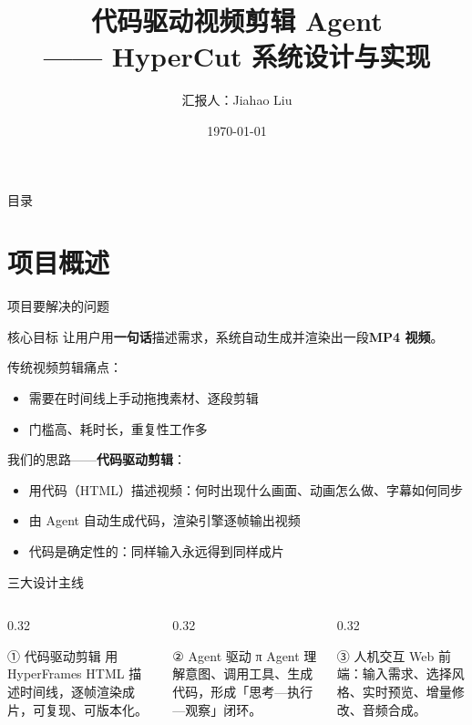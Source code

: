 \documentclass[aspectratio=169,11pt]{beamer}
\title{代码驱动视频剪辑 Agent\\—— HyperCut 系统设计与实现}
\author{汇报人：Jiahao Liu}
\institute{项目：HyperCut · π Agent $\times$ HyperFrames}
\date{\today}
\begin{document}
\begin{frame}
  \titlepage
\end{frame}

\begin{frame}{目录}
  \tableofcontents
\end{frame}

\section{项目概述}

\begin{frame}{项目要解决的问题}
  \begin{block}{核心目标}
    让用户用\textbf{一句话}描述需求，系统自动生成并渲染出一段\textbf{MP4 视频}。
  \end{block}
  \vspace{0.5em}
  传统视频剪辑痛点：
  \begin{itemize}
    \item 需要在时间线上手动拖拽素材、逐段剪辑
    \item 门槛高、耗时长，重复性工作多
  \end{itemize}
  \vspace{0.5em}
  我们的思路——\textbf{代码驱动剪辑}：
  \begin{itemize}
    \item 用代码（HTML）描述视频：何时出现什么画面、动画怎么做、字幕如何同步
    \item 由 Agent 自动生成代码，渲染引擎逐帧输出视频
    \item 代码是确定性的：同样输入永远得到同样成片
  \end{itemize}
\end{frame}

\begin{frame}{三大设计主线}
  \begin{columns}[T]
    \begin{column}{0.32\textwidth}
      \begin{block}{① 代码驱动剪辑}
        用 HyperFrames HTML 描述时间线，逐帧渲染成片，可复现、可版本化。
      \end{block}
    \end{column}
    \begin{column}{0.32\textwidth}
      \begin{block}{② Agent 驱动}
        π Agent 理解意图、调用工具、生成代码，形成「思考—执行—观察」闭环。
      \end{block}
    \end{column}
    \begin{column}{0.32\textwidth}
      \begin{block}{③ 人机交互}
        Web 前端：输入需求、选择风格、实时预览、增量修改、音频合成。
      \end{block}
    \end{column}
  \end{columns}
\end{frame}
\end{document}
